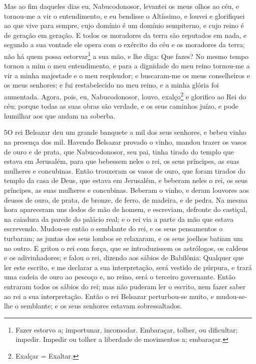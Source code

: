 Mas ao fim daqueles dias eu, Nabucodonosor, levantei os meus
olhos ao céu, e tornou-me a vir o entendimento, e eu bendisse o
Altíssimo, e louvei e glorifiquei ao que vive para sempre, cujo
domínio é um domínio sempiterno, e cujo reino é de geração em
geração. E todos os moradores da terra são reputados em nada,
e segundo a sua vontade ele opera com o exército do céu e os
moradores da terra; não há quem possa estorvar\footnote{Fazer
estorvo a; importunar, incomodar. Embaraçar, tolher, ou dificultar;
impedir. Impedir ou tolher a liberdade de movimentos a; embaraçar.}
a sua mão, e lhe diga: Que fazes? No mesmo tempo tornou a mim
o meu entendimento, e para a dignidade do meu reino tornou-me a vir
a minha majestade e o meu resplendor; e buscaram-me os meus
conselheiros e os meus senhores; e fui restabelecido no meu reino, e
a minha glória foi aumentada. Agora, pois, eu, Nabucodonosor,
louvo, exalço\footnote{Exalçar = Exaltar.} e glorifico ao Rei do
céu; porque todas as suas obras são verdade, e os seus caminhos
juízo, e pode humilhar aos que andam na soberba.

\medskip

\lettrine{5} O rei Belsazar deu um grande banquete a mil dos
seus senhores, e bebeu vinho na presença dos mil. Havendo
Belsazar provado o vinho, mandou trazer os vasos de ouro e de prata,
que Nabucodonosor, seu pai, tinha tirado do templo que estava em
Jerusalém, para que bebessem neles o rei, os seus príncipes, as suas
mulheres e concubinas. Então trouxeram os vasos de ouro, que
foram tirados do templo da casa de Deus, que estava em Jerusalém, e
beberam neles o rei, os seus príncipes, as suas mulheres e
concubinas. Beberam o vinho, e deram louvores aos deuses de
ouro, de prata, de bronze, de ferro, de madeira, e de pedra. Na
mesma hora apareceram uns dedos de mão de homem, e escreviam,
defronte do castiçal, na caiadura da parede do palácio real; e o rei
via a parte da mão que estava escrevendo. Mudou-se então o
semblante do rei, e os seus pensamentos o turbaram; as juntas dos
seus lombos se relaxaram, e os seus joelhos batiam um no outro.
E gritou o rei com força, que se introduzissem os astrólogos, os
caldeus e os adivinhadores; e falou o rei, dizendo aos sábios de
Babilônia: Qualquer que ler este escrito, e me declarar a sua
interpretação, será vestido de púrpura, e trará uma cadeia de ouro
ao pescoço e, no reino, será o terceiro governante. Então
entraram todos os sábios do rei; mas não puderam ler o escrito, nem
fazer saber ao rei a sua interpretação. Então o rei Belsazar
perturbou-se muito, e mudou-se-lhe o semblante; e os seus senhores
estavam sobressaltados.

